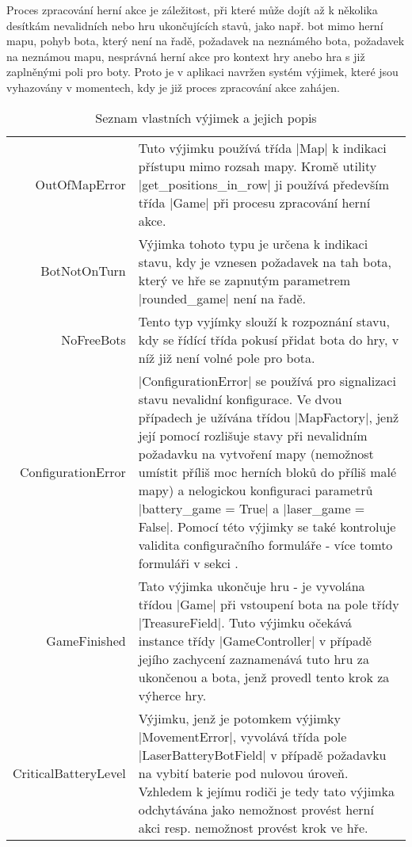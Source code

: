 Proces zpracování herní akce je záležitost, při které může dojít až k několika desítkám nevalidních nebo hru ukončujících stavů, jako např. bot mimo herní mapu, pohyb bota, který není na řadě, požadavek na neznámého bota, požadavek na neznámou mapu, nesprávná herní akce pro kontext hry anebo hra s již zaplněnými poli pro boty. Proto je v aplikaci navržen systém výjimek, které jsou vyhazovány v momentech, kdy je již proces zpracování akce zahájen.

\begin{table}[H]
	\renewcommand{\arraystretch}{1.2}
	\centering
	
	\begin{tabular}{ B || p{.6\textwidth} }
		OutOfMapError & Tuto výjimku používá třída \ic|Map| k indikaci přístupu mimo rozsah mapy. Kromě utility \ic|get_positions_in_row| ji používá především třída \ic|Game| při procesu zpracování herní akce. \\

		BotNotOnTurn & Výjimka tohoto typu je určena k indikaci stavu, kdy je vznesen požadavek na tah bota, který ve hře se zapnutým parametrem \ic|rounded_game| není na řadě. \\

		NoFreeBots & Tento typ vyjímky slouží k rozpoznání stavu, kdy se řídící třída pokusí přidat bota do hry, v níž již není volné pole pro bota. \\

		ConfigurationError & \ic|ConfigurationError| se používá pro signalizaci stavu nevalidní konfigurace. Ve dvou případech je užívána třídou \ic|MapFactory|, jenž její pomocí rozlišuje stavy při nevalidním požadavku na vytvoření mapy (nemožnost umístit příliš moc herních bloků do příliš malé mapy) a nelogickou konfiguraci parametrů \ic|battery_game = True| a \ic|laser_game = False|. Pomocí této výjimky se také kontroluje validita configuračního formuláře - více tomto formuláři v sekci . \\

		GameFinished & Tato výjimka ukončuje hru - je vyvolána třídou \ic|Game| při vstoupení bota na pole třídy \ic|TreasureField|. Tuto výjimku očekává instance třídy \ic|GameController| v případě jejího zachycení zaznamenává tuto hru za ukončenou a bota, jenž provedl tento krok za výherce hry. \\

		CriticalBatteryLevel & Výjimku, jenž je potomkem výjimky \ic|MovementError|, vyvolává třída pole \ic|LaserBatteryBotField| v případě požadavku na vybití baterie pod nulovou úroveň. Vzhledem k jejímu rodiči je tedy tato výjimka odchytávána jako nemožnost provést herní akci resp. nemožnost provést krok ve hře. \\
	\end{tabular}
	\caption{Seznam vlastních výjimek a jejich popis}
\end{table}

